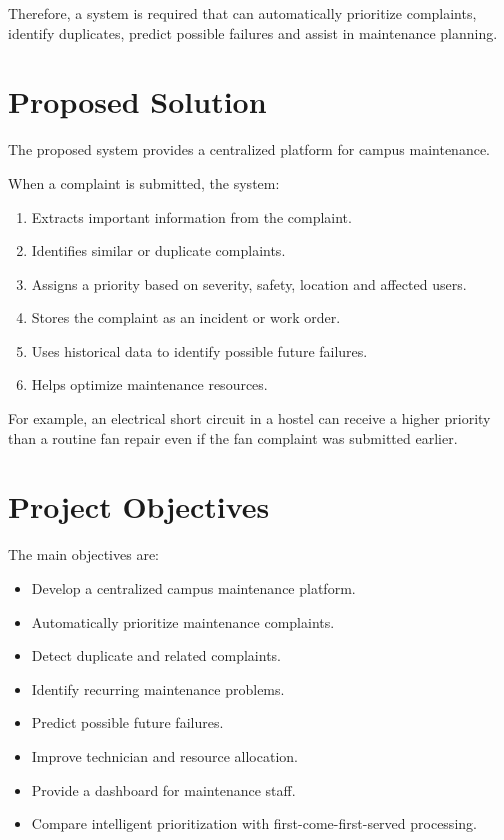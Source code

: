 \documentclass[12pt,a4paper]{article}
\begin{document}
Therefore, a system is required that can automatically prioritize complaints, identify duplicates, predict possible failures and assist in maintenance planning.



\section{Proposed Solution}

The proposed system provides a centralized platform for campus maintenance.

When a complaint is submitted, the system:

\begin{enumerate}
    \item Extracts important information from the complaint.
    \item Identifies similar or duplicate complaints.
    \item Assigns a priority based on severity, safety, location and affected users.
    \item Stores the complaint as an incident or work order.
    \item Uses historical data to identify possible future failures.
    \item Helps optimize maintenance resources.
\end{enumerate}

For example, an electrical short circuit in a hostel can receive a higher priority than a routine fan repair even if the fan complaint was submitted earlier.



\section{Project Objectives}

The main objectives are:

\begin{itemize}
    \item Develop a centralized campus maintenance platform.
    \item Automatically prioritize maintenance complaints.
    \item Detect duplicate and related complaints.
    \item Identify recurring maintenance problems.
    \item Predict possible future failures.
    \item Improve technician and resource allocation.
    \item Provide a dashboard for maintenance staff.
    \item Compare intelligent prioritization with first-come-first-served processing.
\end{itemize}
\end{document}
